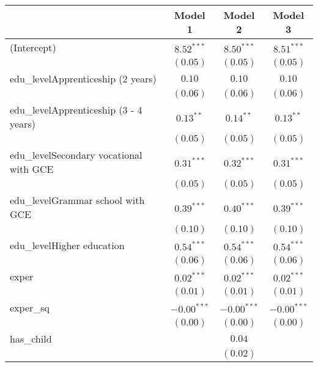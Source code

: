 
\begin{table}
\begin{center}
\begin{tabular}{l c c c}
\hline
 & Model 1 & Model 2 & Model 3 \\
\hline
(Intercept)                             & $8.52^{***}$  & $8.50^{***}$  & $8.51^{***}$  \\
                                        & $(0.05)$      & $(0.05)$      & $(0.05)$      \\
edu\_levelApprenticeship (2 years)      & $0.10$        & $0.10$        & $0.10$        \\
                                        & $(0.06)$      & $(0.06)$      & $(0.06)$      \\
edu\_levelApprenticeship (3 - 4 years)  & $0.13^{**}$   & $0.14^{**}$   & $0.13^{**}$   \\
                                        & $(0.05)$      & $(0.05)$      & $(0.05)$      \\
edu\_levelSecondary vocational with GCE & $0.31^{***}$  & $0.32^{***}$  & $0.31^{***}$  \\
                                        & $(0.05)$      & $(0.05)$      & $(0.05)$      \\
edu\_levelGrammar school with GCE       & $0.39^{***}$  & $0.40^{***}$  & $0.39^{***}$  \\
                                        & $(0.10)$      & $(0.10)$      & $(0.10)$      \\
edu\_levelHigher education              & $0.54^{***}$  & $0.54^{***}$  & $0.54^{***}$  \\
                                        & $(0.06)$      & $(0.06)$      & $(0.06)$      \\
exper                                   & $0.02^{***}$  & $0.02^{***}$  & $0.02^{***}$  \\
                                        & $(0.01)$      & $(0.01)$      & $(0.01)$      \\
exper\_sq                               & $-0.00^{***}$ & $-0.00^{***}$ & $-0.00^{***}$ \\
                                        & $(0.00)$      & $(0.00)$      & $(0.00)$      \\
has\_child                              &               & $0.04$        &               \\
                                        &               & $(0.02)$      &               \\

\end{tabular}
\end{center}
\end{table}

